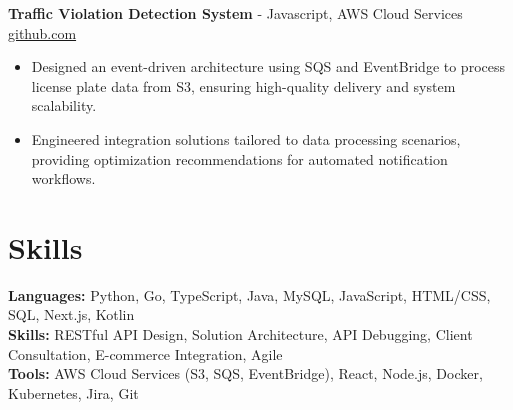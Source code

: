 \documentclass[11pt]{article}       %
\begin{document}

\textbf{Traffic Violation Detection System}{ - Javascript, AWS Cloud Services} \hfill \href{https://github.com/Monica20030707/AWS_rekonigition-N-read-database}{github.com} \\
\vspace{-9pt}
\begin{itemize}
  \item Designed an event-driven architecture using SQS and EventBridge to process license plate data from S3, ensuring high-quality delivery and system scalability.
  \item Engineered integration solutions tailored to data processing scenarios, providing optimization recommendations for automated notification workflows.
\end{itemize}

\vspace{-18.5pt}

\section*{Skills}
\textbf{Languages:} Python, Go, TypeScript, Java, MySQL, JavaScript, HTML/CSS, SQL, Next.js, Kotlin\\
\textbf{Skills:} RESTful API Design, Solution Architecture, API Debugging, Client Consultation, E-commerce Integration, Agile\\
\textbf{Tools:} AWS Cloud Services (S3, SQS, EventBridge), React, Node.js, Docker, Kubernetes, Jira, Git\\

\vspace{-6.5pt}
\end{document}
